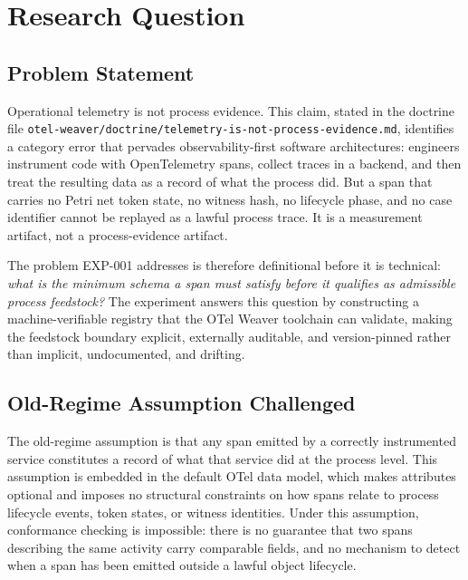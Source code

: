
\section{Research Question}
\label{sec:otel-weaver-exp-001-custom-pi-registry-question}

\subsection{Problem Statement}
\label{sec:otel-weaver-exp-001-custom-pi-registry-question-problem}

Operational telemetry is not process evidence. This claim, stated in the doctrine file
\texttt{otel-weaver/doctrine/telemetry-is-not-process-evidence.md}, identifies a category error
that pervades observability-first software architectures: engineers instrument code with OpenTelemetry
spans, collect traces in a backend, and then treat the resulting data as a record of what the process
did. But a span that carries no Petri net token state, no witness hash, no lifecycle phase, and no
case identifier cannot be replayed as a lawful process trace. It is a measurement artifact, not a
process-evidence artifact.

The problem EXP-001 addresses is therefore definitional before it is technical: \emph{what is the
minimum schema a span must satisfy before it qualifies as admissible process feedstock?}
The experiment answers this question by constructing a machine-verifiable registry that the OTel
Weaver toolchain can validate, making the feedstock boundary explicit, externally auditable, and
version-pinned rather than implicit, undocumented, and drifting.

\subsection{Old-Regime Assumption Challenged}
\label{sec:otel-weaver-exp-001-custom-pi-registry-question-old-regime}

The old-regime assumption is that any span emitted by a correctly instrumented service constitutes
a record of what that service did at the process level. This assumption is embedded in the default
OTel data model, which makes attributes optional and imposes no structural constraints on how
spans relate to process lifecycle events, token states, or witness identities. Under this assumption,
conformance checking is impossible: there is no guarantee that two spans describing the same
activity carry comparable fields, and no mechanism to detect when a span has been emitted outside
a lawful object lifecycle.

